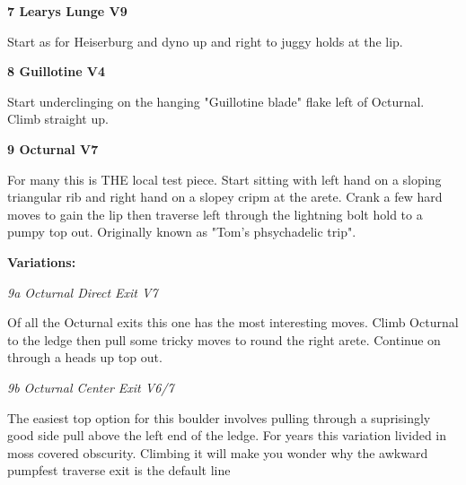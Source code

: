 \begin{multicols}{2}
					\begin{minipage}{\linewidth}	
					\label{rt:Learys Lunge}\colorbox{Goldenrod!50}{\textbf{7 Learys Lunge V9 \ding{72}    }}
					\begin{adjustwidth}{0.5cm}{}				
					Start as for Heiserburg and dyno up and right to juggy holds at the lip.
					\end{adjustwidth}
					\end{minipage}
					\begin{minipage}{\linewidth}	
					\label{rt:Guillotine}\colorbox{RoyalBlue!20}{\textbf{8 Guillotine V4    }}
					\begin{adjustwidth}{0.5cm}{}				
					Start underclinging on the hanging "Guillotine blade" flake left of Octurnal. Climb straight up.
					\end{adjustwidth}
					\end{minipage}
					\begin{minipage}{\linewidth}	
					\label{rt:Octurnal}\colorbox{Goldenrod!50}{\textbf{9 Octurnal V7     }}
					\begin{adjustwidth}{0.5cm}{}				
					For many this is THE local test piece. Start sitting with left hand on a sloping triangular rib and right hand on a slopey cripm at the arete. Crank a few hard moves to gain the lip then traverse left through the lightning bolt hold to a pumpy top out. Originally known as "Tom's phsychadelic trip".
					\end{adjustwidth}
					\end{minipage}
						\begin{adjustwidth}{0.5cm}{}				
						\textbf{Variations:} \newline
							\begin{minipage}{\linewidth}	
							\label{vr:Octurnal Direct Exit}\colorbox{Goldenrod!50}{\emph{9a Octurnal Direct Exit V7  \ding{72}   }}
							\begin{adjustwidth}{0.5cm}{}				
							Of all the Octurnal exits this one has the most interesting moves. Climb Octurnal to the ledge then pull some tricky moves to round the right arete. Continue on through a heads up top out.
							\end{adjustwidth}
							\end{minipage}
							\begin{minipage}{\linewidth}	
							\label{vr:Octurnal Center Exit}\colorbox{Goldenrod!50}{\emph{9b Octurnal Center Exit V6/7    }}
							\begin{adjustwidth}{0.5cm}{}				
							The easiest top option for this boulder involves pulling through a suprisingly good side pull above the left end of the ledge. For years this variation livided in moss covered obscurity. Climbing it will make you wonder why the awkward pumpfest traverse exit is the default line
							\end{adjustwidth}
							\end{minipage}
						\end{adjustwidth}


\end{multicols}
